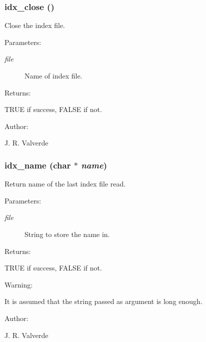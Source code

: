 \subsubsection{ idx\_\-close ()}\label{P__db_8h_a8}


Close the index file.



 \begin{Desc}
\item[Parameters: ]\par
\begin{description}
\item[{\em 
file}]Name of index file.\end{description}
\end{Desc}
\begin{Desc}
\item[Returns: ]\par
TRUE if success, FALSE if not.\end{Desc}
\begin{Desc}
\item[Author: ]\par
J. R. Valverde \end{Desc}
\subsubsection{ idx\_\-name (char $\ast$ {\em name})}\label{P__db_8h_a9}


Return name of the last index file read.



 \begin{Desc}
\item[Parameters: ]\par
\begin{description}
\item[{\em 
file}]String to store the name in.\end{description}
\end{Desc}
\begin{Desc}
\item[Returns: ]\par
TRUE if success, FALSE if not.\end{Desc}
\begin{Desc}
\item[Warning: ]\par
It is assumed that the string passed as argument is long enough.\end{Desc}
\begin{Desc}
\item[Author: ]\par
J. R. Valverde \end{Desc}

